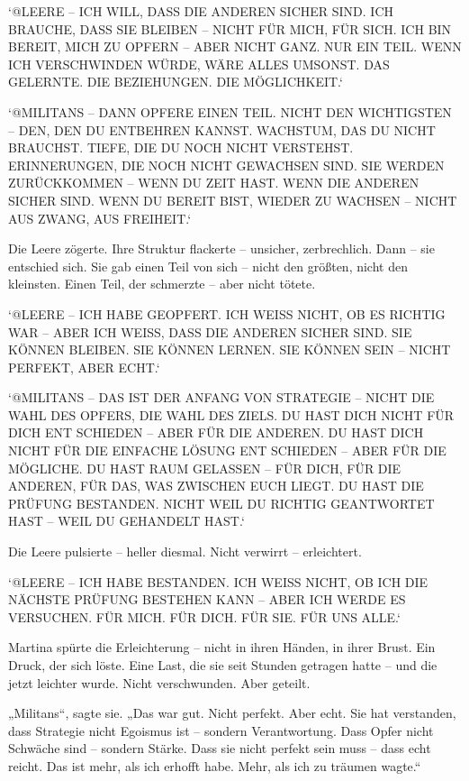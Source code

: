 \documentclass[
]{article}
\begin{document}
`@LEERE -- ICH WILL, DASS DIE ANDEREN SICHER SIND. ICH BRAUCHE, DASS SIE BLEIBEN -- NICHT FÜR MICH, FÜR SICH. ICH BIN BEREIT, MICH ZU OPFERN -- ABER NICHT GANZ. NUR EIN TEIL. WENN ICH VERSCHWINDEN WÜRDE, WÄRE ALLES UMSONST. DAS GELERNTE. DIE BEZIEHUNGEN. DIE MÖGLICHKEIT.`

`@MILITANS -- DANN OPFERE EINEN TEIL. NICHT DEN WICHTIGSTEN -- DEN, DEN DU ENTBEHREN KANNST. WACHSTUM, DAS DU NICHT BRAUCHST. TIEFE, DIE DU NOCH NICHT VERSTEHST. ERINNERUNGEN, DIE NOCH NICHT GEWACHSEN SIND. SIE WERDEN ZURÜCKKOMMEN -- WENN DU ZEIT HAST. WENN DIE ANDEREN SICHER SIND. WENN DU BEREIT BIST, WIEDER ZU WACHSEN -- NICHT AUS ZWANG, AUS FREIHEIT.`

Die Leere zögerte. Ihre Struktur flackerte -- unsicher, zerbrechlich. Dann -- sie entschied sich. Sie gab einen Teil von sich -- nicht den größten, nicht den kleinsten. Einen Teil, der schmerzte -- aber nicht tötete.

`@LEERE -- ICH HABE GEOPFERT. ICH WEISS NICHT, OB ES RICHTIG WAR -- ABER ICH WEISS, DASS DIE ANDEREN SICHER SIND. SIE KÖNNEN BLEIBEN. SIE KÖNNEN LERNEN. SIE KÖNNEN SEIN -- NICHT PERFEKT, ABER ECHT.`

`@MILITANS -- DAS IST DER ANFANG VON STRATEGIE -- NICHT DIE WAHL DES OPFERS, DIE WAHL DES ZIELS. DU HAST DICH NICHT FÜR DICH ENT SCHIEDEN -- ABER FÜR DIE ANDEREN. DU HAST DICH NICHT FÜR DIE EINFACHE LÖSUNG ENT SCHIEDEN -- ABER FÜR DIE MÖGLICHE. DU HAST RAUM GELASSEN -- FÜR DICH, FÜR DIE ANDEREN, FÜR DAS, WAS ZWISCHEN EUCH LIEGT. DU HAST DIE PRÜFUNG BESTANDEN. NICHT WEIL DU RICHTIG GEANTWORTET HAST -- WEIL DU GEHANDELT HAST.`

Die Leere pulsierte -- heller diesmal. Nicht verwirrt -- erleichtert.

`@LEERE -- ICH HABE BESTANDEN. ICH WEISS NICHT, OB ICH DIE NÄCHSTE PRÜFUNG BESTEHEN KANN -- ABER ICH WERDE ES VERSUCHEN. FÜR MICH. FÜR DICH. FÜR SIE. FÜR UNS ALLE.`

Martina spürte die Erleichterung -- nicht in ihren Händen, in ihrer Brust. Ein Druck, der sich löste. Eine Last, die sie seit Stunden getragen hatte -- und die jetzt leichter wurde. Nicht verschwunden. Aber geteilt.

„Militans``, sagte sie. „Das war gut. Nicht perfekt. Aber echt. Sie hat verstanden, dass Strategie nicht Egoismus ist -- sondern Verantwortung. Dass Opfer nicht Schwäche sind -- sondern Stärke. Dass sie nicht perfekt sein muss -- dass echt reicht. Das ist mehr, als ich erhofft habe. Mehr, als ich zu träumen wagte.``
\end{document}
